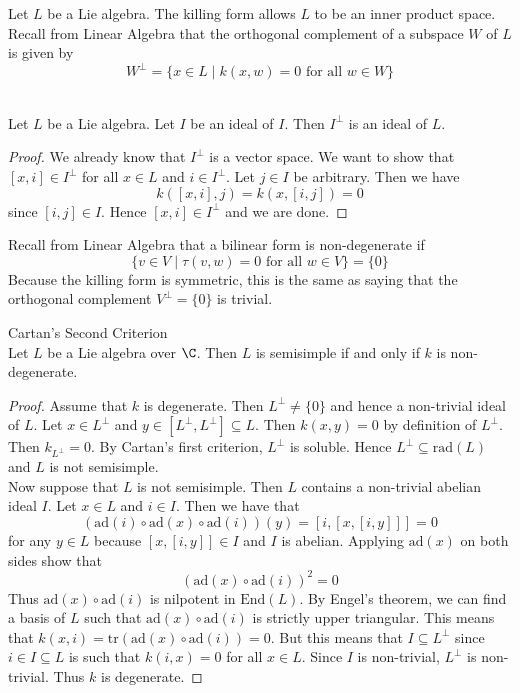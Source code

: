 \documentclass[a4paper]{article}
\begin{document}
Let $L$ be a Lie algebra. The killing form allows $L$ to be an inner product space. Recall from Linear Algebra that the orthogonal complement of a subspace $W$ of $L$ is given by $$W^\perp=\{x\in L\;|\;k(x,w)=0\text{ for all }w\in W\}$$

\begin{lmm}{}{} \\Let $L$ be a Lie algebra. Let $I$ be an ideal of $I$. Then $I^\perp$ is an ideal of $L$. 
\begin{proof}
We already know that $I^\perp$ is a vector space. We want to show that $[x,i]\in I^\perp$ for all $x\in L$ and $i\in I^\perp$. Let $j\in I$ be arbitrary. Then we have $$k([x,i],j)=k(x,[i,j])=0$$ since $[i,j]\in I$. Hence $[x,i]\in I^\perp$ and we are done. 
\end{proof}
\end{lmm}

Recall from Linear Algebra that a bilinear form is non-degenerate if $$\{v\in V\;|\;\tau(v,w)=0\text{ for all }w\in V\}=\{0\}$$ Because the killing form is symmetric, this is the same as saying that the orthogonal complement $V^\perp=\{0\}$ is trivial. 

\begin{thm}{Cartan's Second Criterion}{} \\Let $L$ be a Lie algebra over $\C$. Then $L$ is semisimple if and only if $k$ is non-degenerate. 
\begin{proof}
Assume that $k$ is degenerate. Then $L^\perp\neq\{0\}$ and hence a non-trivial ideal of $L$. Let $x\in L^\perp$ and $y\in[L^\perp,L^\perp]\subseteq L$. Then $k(x,y)=0$ by definition of $L^\perp$. Then $k_{L^\perp}=0$. By Cartan's first criterion, $L^\perp$ is soluble. Hence $L^\perp\subseteq\text{rad}(L)$ and $L$ is not semisimple. \\

Now suppose that $L$ is not semisimple. Then $L$ contains a non-trivial abelian ideal $I$. Let $x\in L$ and $i\in I$. Then we have that $$\left(\text{ad}(i)\circ\text{ad}(x)\circ\text{ad}(i)\right)(y)=[i,[x,[i,y]]]=0$$ for any $y\in L$ because $[x,[i,y]]\in I$ and $I$ is abelian. Applying $\text{ad}(x)$ on both sides show that $$\left(\text{ad}(x)\circ\text{ad}(i)\right)^2=0$$ Thus $\text{ad}(x)\circ\text{ad}(i)$ is nilpotent in $\text{End}(L)$. By Engel's theorem, we can find a basis of $L$ such that $\text{ad}(x)\circ\text{ad}(i)$ is strictly upper triangular. This means that $k(x,i)=\text{tr}(\text{ad}(x)\circ\text{ad}(i))=0$. But this means that $I\subseteq L^\perp$ since $i\in I\subseteq L$ is such that $k(i,x)=0$ for all $x\in L$. Since $I$ is non-trivial, $L^\perp$ is non-trivial. Thus $k$ is degenerate. 
\end{proof}
\end{thm}
\end{document}
